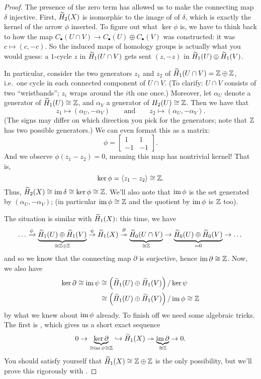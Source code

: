 \begin{proof}
	The presence of the zero term has allowed us to make the connecting map $\delta$ injective.
	First, $\widetilde H_2(X)$ is isomorphic to the image of of $\delta$, which is
	exactly the kernel of the arrow $\phi$ inserted.
	To figure out what $\ker \phi$ is, we have to think back to how the map
	$C_\bullet(U \cap V) \to C_\bullet(U) \oplus C_\bullet(V)$ was constructed:
	it was $c \mapsto (c, -c)$.
	So the induced maps of homology groups is actually what you would guess:
	a $1$-cycle $z$ in $\widetilde H_1(U \cap V)$ gets sent $(z, -z)$ in $\widetilde H_1(U) \oplus \widetilde H_1(V)$.

	In particular, consider the two generators $z_1$ and $z_2$ of
	$\widetilde H_1(U \cap V) = \mathbb Z \oplus \mathbb Z$,
	i.e.\ one cycle in each connected component of $U \cap V$.
	(To clarify: $U \cap V$ consists of two ``wristbands'';
	$z_i$ wraps around the $i$th one once.)
	Moreover, let $\alpha_U$ denote a generator of $\widetilde H_1(U) \cong \mathbb Z$,
	and $\alpha_V$ a generator of $H_2(U) \cong \mathbb Z$.
	Then we have that
	\[ z_1 \mapsto (\alpha_U, -\alpha_V) \qquad\text{and}\qquad z_2 \mapsto (\alpha_U, -\alpha_V). \]
	(The signs may differ on which direction you pick for the generators;
	note that $\mathbb Z$ has two possible generators.)
	We can even format this as a matrix:
	\[ \phi = \begin{bmatrix} 1 & 1 \\ -1 & -1 \end{bmatrix}. \]
	And we observe $\phi(z_1 - z_2) = 0$, meaning this map has nontrivial kernel!
	That is, \[ \ker\phi = \left< z_1 - z_2 \right> \cong \mathbb Z. \]
	Thus, $\widetilde H_2(X) \cong \operatorname{im} \delta \cong \ker \phi \cong \mathbb Z$.
	We'll also note that $\operatorname{im} \phi$ is the set generated by $(\alpha_U, -\alpha_V)$;
	(in particular $\operatorname{im}\phi \cong \mathbb Z$ and the quotient by $\operatorname{im}\phi$ is $\mathbb Z$ too).

	The situation is similar with $\widetilde H_1(X)$: this time, we have
	\[ 
		\dots 
		\xrightarrow{\phi} \underbrace{\widetilde H_1(U) \oplus \widetilde H_1(V)}_{\cong \mathbb Z \oplus \mathbb Z}
		\overset{\psi}{\to} \widetilde H_1(X) \overset\partial{\twoheadrightarrow}
		\underbrace{\widetilde H_0(U \cap V)}_{\cong \mathbb Z} 
		\to \underbrace{\widetilde H_0(U) \oplus \widetilde H_0(V)}_{=0} \to \dots
	\]
	and so we know that the connecting map $\partial$ is surjective,
	hence $\operatorname{im} \partial \cong \mathbb Z$.
	Now, we also have
	\begin{align*}
		\ker \partial \cong \operatorname{im} \psi &\cong \left( \widetilde H_1(U) \oplus \widetilde H_1(V) \right) / \ker \psi \\
		&\cong \left( \widetilde H_1(U) \oplus \widetilde H_1(V) \right) / \operatorname{im} \phi
		\cong \mathbb Z
	\end{align*}
	by what we knew about $\operatorname{im} \phi$ already.
	To finish off we need some algebraic tricks. The first is ,
	which gives us a short exact sequence
	\[
		0 \to \underbrace{\ker\partial}_{\cong \operatorname{im}\psi \cong \mathbb Z} 
		\hookrightarrow \widetilde H_1(X)
		\twoheadrightarrow \underbrace{\operatorname{im}\partial}_{\cong \mathbb Z} \to 0.
	\]
	You should satisfy yourself that $\widetilde H_1(X) \cong \mathbb Z \oplus \mathbb Z$ is the
	only possibility, but we'll prove this rigorously with .
\end{proof}

